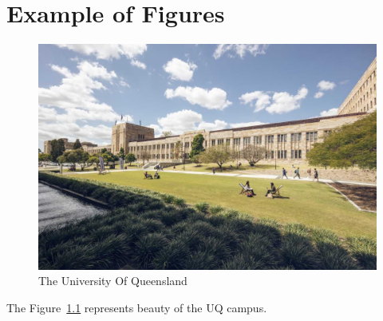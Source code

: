 
%

\chapter{Example of Figures}

\begin{figure}[h]
\begin{center}
\includegraphics[width=1.0\textwidth]{Examples/FigureUQ}
\caption{The University Of Queensland}
\label{Fig:1}
\end{center}
\end{figure}

The Figure~\ref{Fig:1} represents beauty of the UQ campus.